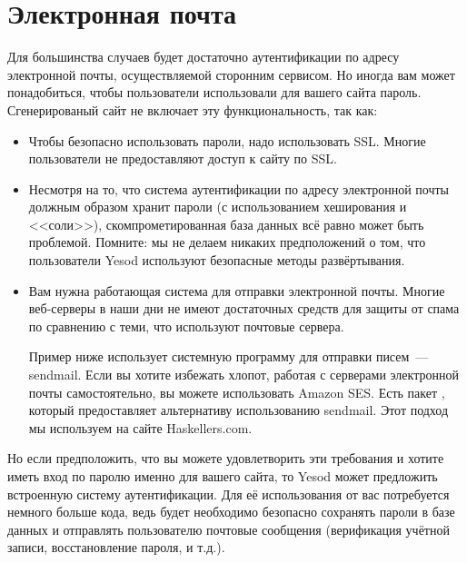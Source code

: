 \section{Электронная почта}

Для большинства случаев будет достаточно аутентификации по адресу электронной
почты, осуществляемой сторонним сервисом. Но иногда вам может понадобиться,
чтобы пользователи использовали для вашего сайта пароль. Сгенерированый сайт не
включает эту функциональность, так как:

\begin{itemize}
    \item Чтобы безопасно использовать пароли, надо использовать SSL. Многие
        пользователи не предоставляют доступ к сайту по SSL.

    \item Несмотря на то, что система аутентификации по адресу электронной
        почты должным образом хранит пароли (с использованием хеширования и
        <<соли>>), скомпрометированная база данных всё равно может быть
        проблемой. Помните: мы не делаем никаких предположений о том, что
        пользователи Yesod используют безопасные методы развёртывания.

    \item Вам нужна работающая система для отправки электронной почты. Многие
        веб-серверы в наши дни не имеют достаточных средств для защиты от спама
        по сравнению с теми, что используют почтовые сервера.

    \begin{remark}
        Пример ниже использует системную программу для отправки писем~---
        sendmail. Если вы хотите избежать хлопот, работая с серверами
        электронной почты самостоятельно, вы можете использовать Amazon SES.
        Есть пакет
        ,
        который предоставляет альтернативу использованию sendmail. Этот подход
        мы используем на сайте Haskellers.com.
    \end{remark}
\end{itemize}

Но если предположить, что вы можете удовлетворить эти требования и хотите иметь
вход по паролю именно для вашего сайта, то Yesod может предложить встроенную
систему аутентификации. Для её использования от вас потребуется немного больше
кода, ведь будет необходимо безопасно сохранять пароли в базе данных и
отправлять пользователю почтовые сообщения (верификация учётной записи,
восстановление пароля, и т.д.).

